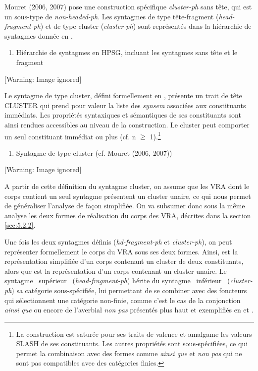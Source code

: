 Mouret (2006, 2007) pose une construction spécifique \textit{cluster-ph} sans tête, qui est un sous-type de \textit{non-headed-ph}. Les syntagmes de type tête-fragment (\textit{head-fragment-ph}) et de type cluster (\textit{cluster-ph}) sont représentés dans la hiérarchie de syntagmes donnée en . 


\begin{enumerate}
\item \label{bkm:Ref299020979}\label{bkm:Ref298949932}Hiérarchie de syntagmes en HPSG, incluant les syntagmes sans tête et le fragment


\end{enumerate}
  [Warning: Image ignored] %
 

Le syntagme de type cluster, défini formellement en , présente un trait de tête CLUSTER qui prend pour valeur la liste des \textit{synsem} associées aux constituants immédiats. Les propriétés syntaxiques et sémantiques de ses constituants sont ainsi rendues accessibles au niveau de la construction. Le cluster peut comporter un seul constituant immédiat ou plus (cf. n ${\geq}$ 1).\footnote{La construction est saturée pour ses traits de valence et amalgame les valeurs SLASH de ses constituants. Les autres propriétés sont sous-spécifiées, ce qui permet la combinaison avec des formes comme \textit{ainsi que} et \textit{non pas} qui ne sont pas compatibles avec des catégories finies.} 


\begin{enumerate}
\item \label{bkm:Ref298950323}Syntagme de type cluster (cf. Mouret (2006, 2007))


\end{enumerate}
  [Warning: Image ignored] %
 

A partir de cette définition du syntagme cluster, on assume que les VRA dont le corps contient un seul syntagme présentent un cluster unaire, ce qui nous permet de généraliser l'analyse de façon simplifiée. On va subsumer donc sous la même analyse les deux formes de réalisation du corps des VRA, décrites dans la section \ref{sec:5.2.2}. 

Une fois les deux syntagmes définis (\textit{hd-fragment-ph} et \textit{cluster-ph}), on peut représenter formellement le corps du VRA sous ses deux formes. Ainsi,  est la représentation simplifiée d'un corps contenant un cluster de deux constituants, alors que  est la représentation d'un corps contenant un cluster unaire. Le syntagme {\guillemotleft}~supérieur~{\guillemotright} (\textit{head-fragment-ph}) hérite du syntagme {\guillemotleft}~inférieur~{\guillemotright} (\textit{cluster-ph}) sa catégorie sous-spécifiée, lui permettant de se combiner avec des foncteurs qui sélectionnent une catégorie non-finie, comme c'est le cas de la conjonction \textit{ainsi que} ou encore de l'averbial \textit{non pas} présentés plus haut et exemplifiés en  et .


